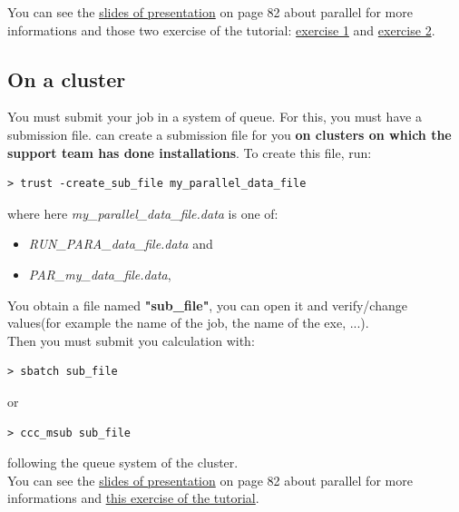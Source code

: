 You can see the \href{TRUST_and_TrioCFD_presentation.pdf}{slides of \trust presentation} on page 82 about parallel for more informations and those two exercise of the tutorial: \href{TRUST_tutorial.pdf\#exo_para_1}{exercise 1} and \href{TRUST_tutorial.pdf\#prm_para}{exercise 2}.

\subsection{On a cluster}
You must submit your job in a system of queue.
For this, you must have a submission file.
\trust can create a submission file for you \textbf{on clusters on which the support team has done installations}.
To create this file, run:
\begin{verbatim}
> trust -create_sub_file my_parallel_data_file
\end{verbatim}
where here \textit{my\_parallel\_data\_file.data} is one of:
\begin{itemize}
\item \textit{RUN\_PARA\_data\_file.data} and
\item \textit{PAR\_my\_data\_file.data},
\end{itemize}

You obtain a file named \textbf{"sub\_file"}, you can open it and verify/change values(for example the name of the job, the name of the exe, ...).\\

Then you must submit you calculation with:
\begin{verbatim}
> sbatch sub_file
\end{verbatim}
or 
\begin{verbatim}
> ccc_msub sub_file
\end{verbatim}
following the queue system of the cluster.\\


You can see the \href{TRUST_and_TrioCFD_presentation.pdf}{slides of \trust presentation} on page 82 about parallel for more informations and \href{TRUST_tutorial.pdf\#exo_para_3}{this exercise of the \trust tutorial}.


